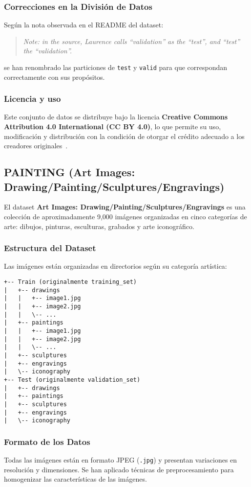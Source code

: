 \subsubsection{Correcciones en la División de Datos}
Según la nota observada en el README del dataset:
\begin{quote}
\textit{Note: in the source, Laurence calls ``validation'' as the ``test'', and ``test'' the ``validation''.}
\end{quote}
se han renombrado las particiones de \texttt{test} y \texttt{valid} para que correspondan correctamente con sus
propósitos.

\subsubsection{Licencia y uso}
 Este conjunto de datos se distribuye bajo la licencia
\textbf{Creative Commons Attribution 4.0 International (CC BY 4.0)}, lo que permite su uso, modificación y distribución
con la condición de otorgar el crédito adecuado a los creadores originales~\cite{moroney_laurence_nodate}.


\subsection{PAINTING (Art Images: Drawing/Painting/Sculptures/Engravings)}\label{subsec:painting}
El dataset \textbf{Art Images: Drawing/Painting/Sculptures/Engravings} es una colección de aproximadamente 9,000
imágenes organizadas en cinco categorías de arte: dibujos, pinturas, esculturas, grabados y arte iconográfico.

\subsubsection{Estructura del Dataset}
Las imágenes están organizadas en directorios según su categoría artística:
\begin{verbatim}
+-- Train (originalmente training_set)
|   +-- drawings
|   |   +-- image1.jpg
|   |   +-- image2.jpg
|   |   \-- ...
|   +-- paintings
|   |   +-- image1.jpg
|   |   +-- image2.jpg
|   |   \-- ...
|   +-- sculptures
|   +-- engravings
|   \-- iconography
+-- Test (originalmente validation_set)
|   +-- drawings
|   +-- paintings
|   +-- sculptures
|   +-- engravings
|   \-- iconography
\end{verbatim}

\subsubsection{Formato de los Datos}
Todas las imágenes están en formato JPEG (\texttt{.jpg}) y presentan variaciones en resolución y dimensiones.
Se han aplicado técnicas de preprocesamiento para homogenizar las características de las imágenes.

